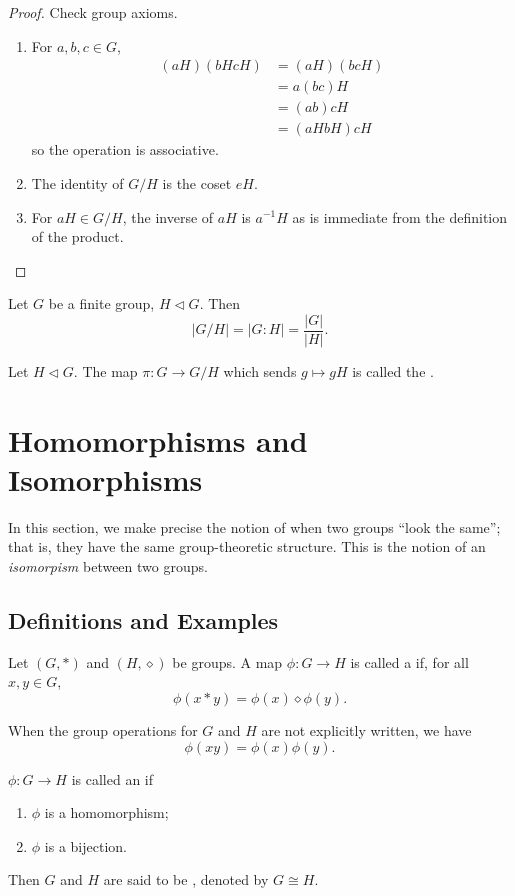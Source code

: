 \begin{proof}
Check group axioms.
\begin{enumerate}[label=(\roman*)]
\item For $a,b,c\in G$,
\begin{align*}
(aH)(bHcH)&=(aH)(bcH)\\
&=a(bc)H\\
&=(ab)cH\\
&=(aHbH)cH
\end{align*}
so the operation is associative.
\item The identity of $G/H$ is the coset $eH$.
\item For $aH\in G/H$, the inverse of $aH$ is $a^{-1}H$ as is immediate from the definition of the product.
\end{enumerate}
\end{proof}

\begin{lemma}
Let $G$ be a finite group, $H\triangleleft G$. Then
\[|G/H|=|G:H|=\frac{|G|}{|H|}.\]
\end{lemma}

\begin{definition}
Let $H\triangleleft G$. The map $\pi:G\to G/H$ which sends $g\mapsto gH$ is called the .
\end{definition}
\pagebreak

\section{Homomorphisms and Isomorphisms}
In this section, we make precise the notion of when two groups ``look the same''; that is, they have the same group-theoretic structure. This is the notion of an \emph{isomorpism} between two groups.

\subsection{Definitions and Examples}
\begin{definition}[Homomorphism]
Let $(G,\ast)$ and $(H,\diamond)$ be groups. A map $\phi:G\to H$ is called a  if, for all $x,y\in G$,
\[\phi(x\ast y)=\phi(x)\diamond\phi(y).\]
\end{definition}

When the group operations for $G$ and $H$ are not explicitly written, we have
\[\phi(xy)=\phi(x)\phi(y).\]

\begin{definition}[Isomorphism]
$\phi:G\to H$ is called an  if
\begin{enumerate}[label=(\roman*)]
\item $\phi$ is a homomorphism;
\item $\phi$ is a bijection.
\end{enumerate}
Then $G$ and $H$ are said to be , denoted by $G\cong H$.
\end{definition}

